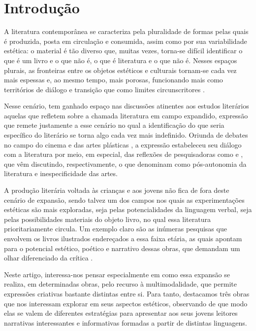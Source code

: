 \documentclass[portuguese]{textolivre}
\begin{document}
\section{Introdução}

A literatura contemporânea se caracteriza pela pluralidade de formas pelas
quais é produzida, posta em circulação e consumida, assim como por sua
variabilidade estética: o material é tão diverso que, muitas vezes, torna-se
difícil identificar o que é um livro e o que não é, o que é literatura e o que
não é. Nesses espaços plurais, as fronteiras entre os objetos estéticos e
culturais tornam-se cada vez mais espessas e, ao mesmo tempo, mais porosas,
funcionando mais como territórios de diálogo e transição que como limites
circunscritores \cite{hissa_mobilidade_2006}.

Nesse cenário, tem ganhado espaço nas discussões atinentes aos estudos
literários aquelas que refletem sobre a chamada literatura em campo expandido,
expressão que remete justamente a esse cenário no qual a identificação do que
seria específico do literário se torna algo cada vez mais indefinido. Oriunda
de debates no campo do cinema \cite{youngblood_expanded_1970} e das artes
plásticas \cite{krauss_escultura_2008}, a expressão estabeleceu seu diálogo com
a literatura por meio, em especial, das reflexões de pesquisadoras como
\textcite{ludmer2010literaturas} e \textcite{garramuno_frutos_2014}, que vêm discutindo,
respectivamente, o que denominam como pós-autonomia da literatura e
inespecificidade das artes.

A produção literária voltada às crianças e aos jovens
\cite{hunt_critica_2010,zilberman_como_2005} não fica de fora deste cenário de
expansão, sendo talvez um dos campos nos quais as experimentações estéticas são
mais exploradas, seja pelas potencialidades da linguagem verbal, seja pelas
possibilidades materiais do objeto livro, no qual essa literatura
prioritariamente circula. Um exemplo claro são as inúmeras pesquisas que
envolvem os livros ilustrados endereçados a essa faixa etária, as quais apontam
para o potencial estético, poético e narrativo dessas obras, que demandam um
olhar diferenciado da crítica \cite{linden_para_2011}.

Neste artigo, interessa-nos pensar especialmente em como essa expansão se
realiza, em determinadas obras, pelo recurso à multimodalidade, que permite
expressões criativas bastante distintas entre si. Para tanto, destacamos três
obras que nos interessam explorar em seus aspectos estéticos, observando de que
modo elas se valem de diferentes estratégias para apresentar aos seus jovens
leitores narrativas interessantes e informativas formadas a partir de distintas
linguagens.
\end{document}
